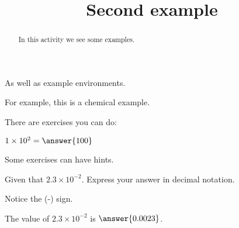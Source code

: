 \documentclass{ximera}
\title{Second example}
\begin{document}
\begin{abstract}
In this activity we see some examples.
\end{abstract}
\maketitle




As well as example environments.

\begin{example}
For example, this is a chemical example.
\end{example}


There are exercises you can do:

\begin{exercise}
$1\times 10^2=\answer{100}$
\end{exercise}

Some exercises can have hints.

\begin{exercise}
Given that $2.3\times 10^{-2}$. Express your answer in decimal notation.
%
\begin{hint}
Notice the (-) sign.
\end{hint}


The value of $2.3\times 10^{-2}$ is $\answer{0.0023}$.
%
\end{exercise}
\end{document}
